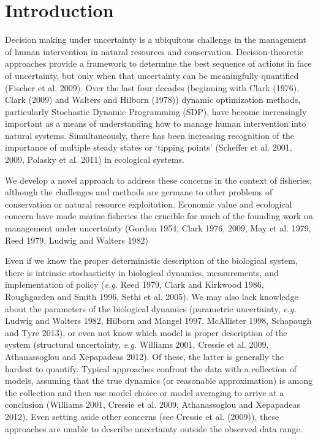 \documentclass[author-year, 12pt,review]{components/elsarticle} %
\begin{document}
\section{Introduction}\label{introduction}

Decision making under uncertainty is a ubiquitous challenge in the
management of human intervention in natural resources and conservation.
Decision-theoretic approaches provide a framework to determine the best
sequence of actions in face of uncertainty, but only when that
uncertainty can be meaningfully quantified (Fischer et al. 2009). Over
the last four decades (beginning with Clark (1976), Clark (2009) and
Walters and Hilborn (1978)) dynamic optimization methods, particularly
Stochastic Dynamic Programming (SDP), have become increasingly important
as a means of understanding how to manage human intervention into
natural systems. Simultaneously, there has been increasing recognition
of the importance of multiple steady states or `tipping points'
(Scheffer et al. 2001, 2009, Polasky et al. 2011) in ecological systems.

We develop a novel approach to address these concerns in the context of
fisheries; although the challenges and methods are germane to other
problems of conservation or natural resource exploitation. Economic
value and ecological concern have made marine fisheries the crucible for
much of the founding work on management under uncertainty (Gordon 1954,
Clark 1976, 2009, May et al. 1979, Reed 1979, Ludwig and Walters 1982)

Even if we know the proper deterministic description of the biological
system, there is intrinsic stochasticity in biological dynamics,
measurements, and implementation of policy (\emph{e.g.} Reed 1979, Clark
and Kirkwood 1986, Roughgarden and Smith 1996, Sethi et al. 2005). We
may also lack knowledge about the parameters of the biological dynamics
(parametric uncertainty, \emph{e.g.} Ludwig and Walters 1982, Hilborn
and Mangel 1997, McAllister 1998, Schapaugh and Tyre 2013), or even not
know which model is proper description of the system (structural
uncertainty, \emph{e.g.} Williams 2001, Cressie et al. 2009,
Athanassoglou and Xepapadeas 2012). Of these, the latter is generally
the hardest to quantify. Typical approaches confront the data with a
collection of models, assuming that the true dynamics (or reasonable
approximation) is among the collection and then use model choice or
model averaging to arrive at a conclusion (Williams 2001, Cressie et al.
2009, Athanassoglou and Xepapadeas 2012). Even setting aside other
concerns (see Cressie et al. (2009)), these approaches are unable to
describe uncertainty outside the observed data range.
\end{document}
